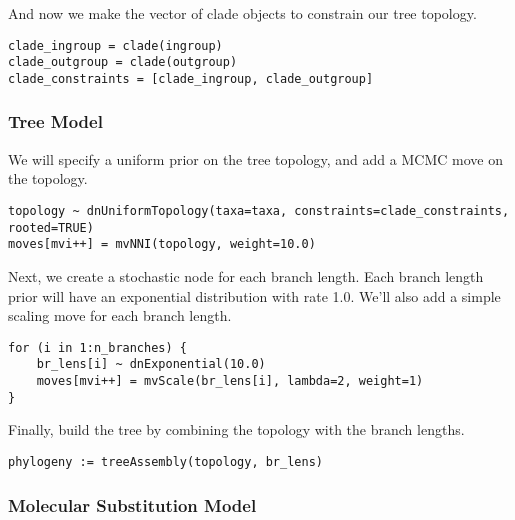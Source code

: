 And now we make the vector of clade objects to constrain our tree topology.
{\tt \begin{snugshade*}
\begin{lstlisting}
clade_ingroup = clade(ingroup)
clade_outgroup = clade(outgroup)
clade_constraints = [clade_ingroup, clade_outgroup]
\end{lstlisting}
\end{snugshade*}}

\subsubsection{Tree Model}

We will specify a uniform prior on the tree topology, and add
a MCMC move on the topology.
{\tt \begin{snugshade*}
\begin{lstlisting}
topology ~ dnUniformTopology(taxa=taxa, constraints=clade_constraints, rooted=TRUE)
moves[mvi++] = mvNNI(topology, weight=10.0)
\end{lstlisting}
\end{snugshade*}}
Next, we create a stochastic node for each branch length.
Each branch length prior will have an exponential distribution with rate 1.0.
We'll also add a simple scaling move for each branch length.
{\tt \begin{snugshade*}
\begin{lstlisting}
for (i in 1:n_branches) {
    br_lens[i] ~ dnExponential(10.0)
    moves[mvi++] = mvScale(br_lens[i], lambda=2, weight=1)
}
\end{lstlisting}
\end{snugshade*}}
Finally, build the tree by combining the topology with the branch lengths.
{\tt \begin{snugshade*}
\begin{lstlisting}
phylogeny := treeAssembly(topology, br_lens)
\end{lstlisting}
\end{snugshade*}}

\subsubsection{Molecular Substitution Model}

